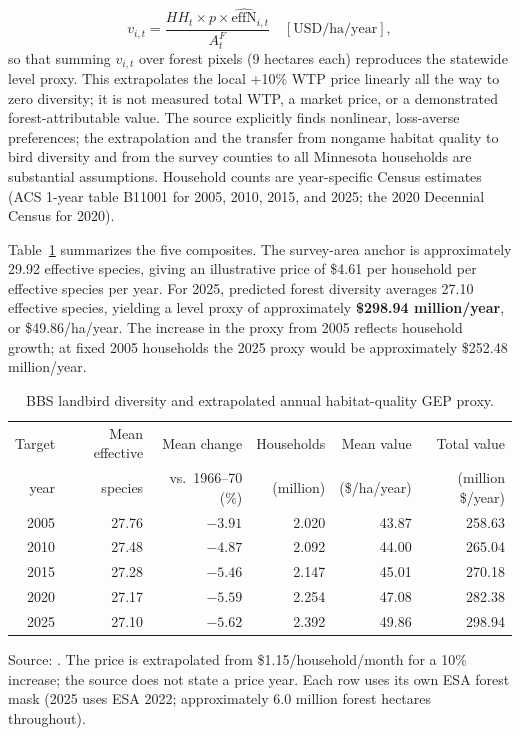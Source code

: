 \documentclass[11pt]{article}
\begin{document}
\begin{equation}
v_{i,t}=\frac{HH_t\times p\times \widehat{\mathrm{effN}}_{i,t}}{A^F_t}
\quad [\mathrm{USD/ha/year}],
\label{eq:implemented-biodiversity}
\end{equation}
so that summing $v_{i,t}$ over forest pixels (9 hectares each) reproduces the statewide level proxy. This extrapolates the local +10\% WTP price linearly all the way to zero diversity; it is not measured total WTP, a market price, or a demonstrated forest-attributable value. The source explicitly finds nonlinear, loss-averse preferences; the extrapolation and the transfer from nongame habitat quality to bird diversity and from the survey counties to all Minnesota households are substantial assumptions. Household counts are year-specific Census estimates (ACS 1-year table B11001 for 2005, 2010, 2015, and 2025; the 2020 Decennial Census for 2020).

Table~\ref{tab:biodiversity-results} summarizes the five composites. The survey-area anchor is approximately 29.92 effective species, giving an illustrative price of \$4.61 per household per effective species per year. For 2025, predicted forest diversity averages 27.10 effective species, yielding a level proxy of approximately \textbf{\$298.94 million/year}, or \$49.86/ha/year. The increase in the proxy from 2005 reflects household growth; at fixed 2005 households the 2025 proxy would be approximately \$252.48 million/year.

\begin{table}[htbp]
\centering
\caption{BBS landbird diversity and extrapolated annual habitat-quality GEP proxy.}
\label{tab:biodiversity-results}
\small
\begin{tabular}{@{}rrrrrr@{}}
\toprule
Target & Mean effective & Mean change & Households & Mean value & Total value \\
year & species & vs.\ 1966--70 (\%) & (million) & (\$/ha/year) & (million \$/year) \\
\midrule
2005 & 27.76 & $-3.91$ & 2.020 & 43.87 & 258.63 \\
2010 & 27.48 & $-4.87$ & 2.092 & 44.00 & 265.04 \\
2015 & 27.28 & $-5.46$ & 2.147 & 45.01 & 270.18 \\
2020 & 27.17 & $-5.59$ & 2.254 & 47.08 & 282.38 \\
2025 & 27.10 & $-5.62$ & 2.392 & 49.86 & 298.94 \\
\bottomrule
\end{tabular}

\smallskip
\begin{minipage}{0.95\linewidth}
\footnotesize Source: . The price is extrapolated from \$1.15/household/month for a 10\% increase; the source does not state a price year. Each row uses its own ESA forest mask (2025 uses ESA 2022; approximately 6.0 million forest hectares throughout).
\end{minipage}
\end{table}
\end{document}

